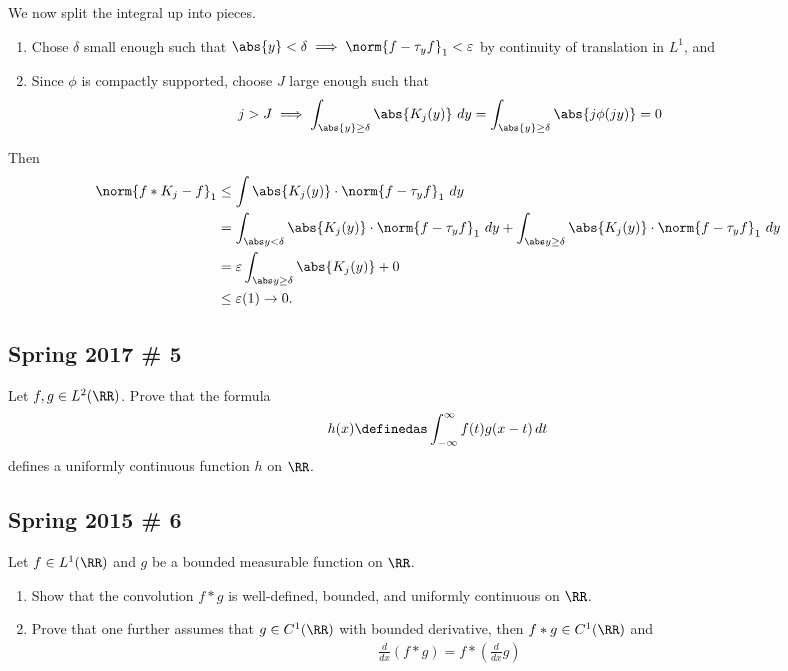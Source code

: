 \begin{solution}
We now split the integral up into pieces.

\begin{enumerate}
\def\labelenumi{\arabic{enumi}.}
\item
  Chose \(\delta\) small enough such that
  \(\abs{y} < \delta \implies \norm{f - \tau_y f}_1 < \varepsilon\) by
  continuity of translation in \(L^1\), and
\item
  Since \(\phi\) is compactly supported, choose \(J\) large enough such
  that
  \begin{align*}
  j > J \implies \int_{\abs{y} \geq \delta} \abs{K_j(y)} ~dy 
  = \int_{\abs{y} \geq \delta} \abs{j\phi(jy)} = 0
  \end{align*}
\end{enumerate}

Then \begin{align*}
\norm{f\ast K_j - f}_1 
&\leq 
\int \abs{K_j(y)} \cdot \norm{f - \tau_y f}_1 ~dy \\
&= \int_{\abs y < \delta} \abs{K_j(y)} \cdot \norm{f - \tau_y f}_1 ~dy 
+ \int_{\abs y \geq  \delta} \abs{K_j(y)} \cdot \norm{f - \tau_y f}_1 ~dy \\
&= \varepsilon \int_{\abs y \geq  \delta} \abs{K_j(y)} + 0 \\
&\leq \varepsilon(1) \to 0
.\end{align*}

\end{solution}

\hypertarget{spring-2017-5}{%
\subsection{Spring 2017 \# 5}\label{spring-2017-5}}

Let \(f, g \in L^2(\RR)\). Prove that the formula
\begin{align*}
h(x) \definedas \int _{-\infty}^{\infty} f(t) g(x-t) \, dt
\end{align*} defines a uniformly continuous function \(h\) on \(\RR\).

\hypertarget{spring-2015-6}{%
\subsection{Spring 2015 \# 6}\label{spring-2015-6}}

Let \(f \in L^1(\RR)\) and \(g\) be a bounded measurable function on
\(\RR\).

\begin{enumerate}
\def\labelenumi{\arabic{enumi}.}
\tightlist
\item
  Show that the convolution \(f\ast g\) is well-defined, bounded, and
  uniformly continuous on \(\RR\).
\item
  Prove that one further assumes that \(g \in C^1(\RR)\) with bounded
  derivative, then \(f\ast g \in C^1(\RR)\) and
  \begin{align*}
  \frac{d}{d x}(f * g)=f *\left(\frac{d}{d x} g\right)
  \end{align*}
\end{enumerate}


